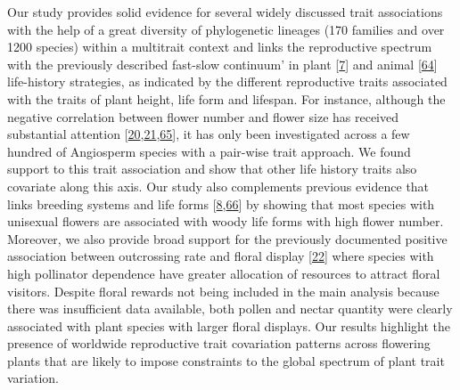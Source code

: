\documentclass[
  12pt,
  a4paper,
]{article}
\begin{document}
Our study provides solid evidence for several widely discussed trait associations with the help of a great diversity of phylogenetic lineages (170 families and over 1200 species) within a multitrait context and links the reproductive spectrum with the previously described fast-slow continuum' in plant {[}\protect\hyperlink{ref-salguero2016}{7}{]} and animal {[}\protect\hyperlink{ref-healy2019}{64}{]} life-history strategies, as indicated by the different reproductive traits associated with the traits of plant height, life form and lifespan. For instance, although the negative correlation between flower number and flower size has received substantial attention {[}\protect\hyperlink{ref-sargent2007}{20},\protect\hyperlink{ref-kettle2011}{21},\protect\hyperlink{ref-worley2000}{65}{]}, it has only been investigated across a few hundred of Angiosperm species with a pair-wise trait approach. We found support to this trait association and show that other life history traits also covariate along this axis. Our study also complements previous evidence that links breeding systems and life forms {[}\protect\hyperlink{ref-friedman2020}{8},\protect\hyperlink{ref-petit2006}{66}{]} by showing that most species with unisexual flowers are associated with woody life forms with high flower number. Moreover, we also provide broad support for the previously documented positive association between outcrossing rate and floral display {[}\protect\hyperlink{ref-goodwillie2010}{22}{]} where species with high pollinator dependence have greater allocation of resources to attract floral visitors. Despite floral rewards not being included in the main analysis because there was insufficient data available, both pollen and nectar quantity were clearly associated with plant species with larger floral displays. Our results highlight the presence of worldwide reproductive trait covariation patterns across flowering plants that are likely to impose constraints to the global spectrum of plant trait variation.
\end{document}
